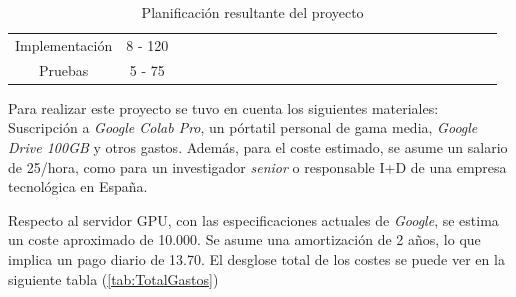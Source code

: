 \begin{table}[H]
{\begin{tabular}{|c|c|ll|llll|llll|lllll|llll|llll|}
Implementación & 8 - 120 &  &  &  &  &  &  &  &  &  \cellcolor[HTML]{9B9B9B} & \cellcolor[HTML]{9B9B9B} & \cellcolor[HTML]{9B9B9B} & \cellcolor[HTML]{9B9B9B} & &  & \cellcolor[HTML]{9B9B9B}  & \cellcolor[HTML]{9B9B9B}  & & & \cellcolor[HTML]{9B9B9B} & \cellcolor[HTML]{9B9B9B} &  &  &  \\ \cline{1-1}
Pruebas & 5 - 75 &  &  &  &  &  &  &  &  &  &  &  &  & \cellcolor[HTML]{9B9B9B}   & \cellcolor[HTML]{9B9B9B} & & & \cellcolor[HTML]{9B9B9B} & \cellcolor[HTML]{9B9B9B} &  &  & \cellcolor[HTML]{9B9B9B} & \cellcolor[HTML]{9B9B9B} & \\ \hline
\end{tabular}%
}
\caption{Planificación resultante del proyecto}
\label{tab:PlanificacionFinal}
\end{table}

Para realizar este proyecto se tuvo en cuenta los siguientes materiales:
Suscripción a \emph{Google Colab Pro}, un pórtatil personal de gama media, 
\emph{Google Drive 100GB} y otros gastos. 
Además, para el coste estimado, se asume un salario de 25\officialeuro/hora, como para un investigador \emph{senior} o
responsable I+D de una empresa tecnológica en España. 
 
Respecto al servidor GPU, con las especificaciones actuales de \emph{Google}, 
se estima un coste aproximado de 10.000\officialeuro. Se asume una amortización de 2 años, 
lo que implica un pago diario de 13.70\officialeuro. El desglose total de los costes 
se puede ver en la siguiente tabla (\ref{tab:TotalGastos})

